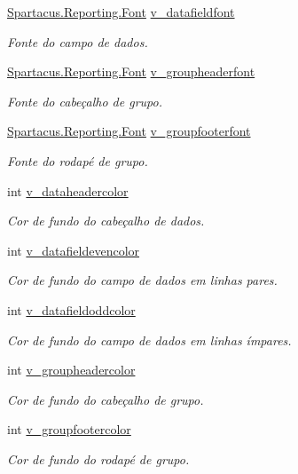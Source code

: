 \begin{DoxyCompactItemize}
\hyperlink{classSpartacus_1_1Reporting_1_1Font}{Spartacus.\+Reporting.\+Font} \hyperlink{classSpartacus_1_1Reporting_1_1Settings_aa13563d61777ea9ac736e3d4a23cb654}{v\+\_\+datafieldfont}
\begin{DoxyCompactList}\small\item\em Fonte do campo de dados. \end{DoxyCompactList}\item 
\hyperlink{classSpartacus_1_1Reporting_1_1Font}{Spartacus.\+Reporting.\+Font} \hyperlink{classSpartacus_1_1Reporting_1_1Settings_a69320d8064355b5302e63a82117d6475}{v\+\_\+groupheaderfont}
\begin{DoxyCompactList}\small\item\em Fonte do cabeçalho de grupo. \end{DoxyCompactList}\item 
\hyperlink{classSpartacus_1_1Reporting_1_1Font}{Spartacus.\+Reporting.\+Font} \hyperlink{classSpartacus_1_1Reporting_1_1Settings_ae7f7e76fc584d001adfb24653fba3798}{v\+\_\+groupfooterfont}
\begin{DoxyCompactList}\small\item\em Fonte do rodapé de grupo. \end{DoxyCompactList}\item 
int \hyperlink{classSpartacus_1_1Reporting_1_1Settings_a7d61c0d057716e9b3ea4507f968cbe09}{v\+\_\+dataheadercolor}
\begin{DoxyCompactList}\small\item\em Cor de fundo do cabeçalho de dados. \end{DoxyCompactList}\item 
int \hyperlink{classSpartacus_1_1Reporting_1_1Settings_a699790df42397dfedbdd098a9b6d942d}{v\+\_\+datafieldevencolor}
\begin{DoxyCompactList}\small\item\em Cor de fundo do campo de dados em linhas pares. \end{DoxyCompactList}\item 
int \hyperlink{classSpartacus_1_1Reporting_1_1Settings_ac89a71cc125c2045538af5448bbdd68e}{v\+\_\+datafieldoddcolor}
\begin{DoxyCompactList}\small\item\em Cor de fundo do campo de dados em linhas ímpares. \end{DoxyCompactList}\item 
int \hyperlink{classSpartacus_1_1Reporting_1_1Settings_a22628a9540c6e6f123268b7ba1111856}{v\+\_\+groupheadercolor}
\begin{DoxyCompactList}\small\item\em Cor de fundo do cabeçalho de grupo. \end{DoxyCompactList}\item 
int \hyperlink{classSpartacus_1_1Reporting_1_1Settings_a99be1d74a932f73b2ad80b3fb9cfddbd}{v\+\_\+groupfootercolor}
\begin{DoxyCompactList}\small\item\em Cor de fundo do rodapé de grupo. \end{DoxyCompactList}\end{DoxyCompactItemize}


